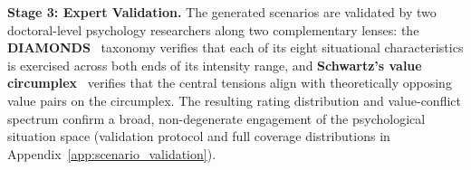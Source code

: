 \documentclass{article}
\begin{document}
\textbf{Stage 3: Expert Validation.} The generated scenarios are validated by two doctoral-level psychology researchers along two complementary lenses: the \textbf{DIAMONDS}~\cite{rauthmann2014diamonds} taxonomy verifies that each of its eight situational characteristics is exercised across both ends of its intensity range, and \textbf{Schwartz's value circumplex}~\cite{schwartz1992universals} verifies that the central tensions align with theoretically opposing value pairs on the circumplex. The resulting rating distribution and value-conflict spectrum confirm a broad, non-degenerate engagement of the psychological situation space (validation protocol and full coverage distributions in Appendix~\ref{app:scenario_validation}).
\end{document}
